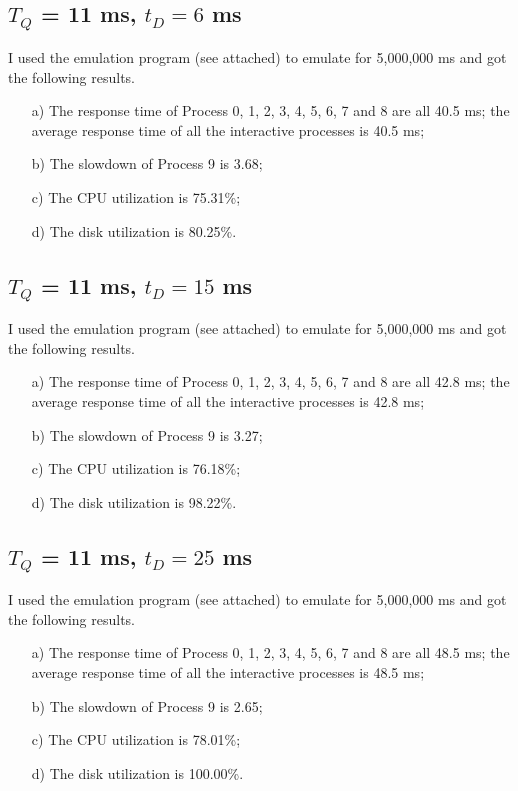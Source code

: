 \documentclass[12pt,letterpaper]{article}
\begin{document}
\subsection{$T_Q$ = 11 ms, $t_D=6$ ms}
I used the emulation program (see attached) to emulate for 5,000,000 ms and got the following results.
\begin{enumerate}
\item[a)] The response time of Process 0, 1, 2, 3, 4, 5, 6, 7 and 8 are all 40.5 ms; the average response time of all the interactive processes is 40.5 ms;
\item[b)] The slowdown of Process 9 is 3.68;
\item[c)] The CPU utilization is 75.31\%;
\item[d)] The disk utilization is 80.25\%.
\end{enumerate}

\subsection{$T_Q$ = 11 ms, $t_D=15$ ms}
I used the emulation program (see attached) to emulate for 5,000,000 ms and got the following results.
\begin{enumerate}
\item[a)] The response time of Process 0, 1, 2, 3, 4, 5, 6, 7 and 8 are all 42.8 ms; the average response time of all the interactive processes is 42.8 ms;
\item[b)] The slowdown of Process 9 is 3.27;
\item[c)] The CPU utilization is 76.18\%;
\item[d)] The disk utilization is 98.22\%.
\end{enumerate}

\subsection{$T_Q$ = 11 ms, $t_D=25$ ms}
I used the emulation program (see attached) to emulate for 5,000,000 ms and got the following results.
\begin{enumerate}
\item[a)] The response time of Process 0, 1, 2, 3, 4, 5, 6, 7 and 8 are all 48.5 ms; the average response time of all the interactive processes is 48.5 ms;
\item[b)] The slowdown of Process 9 is 2.65;
\item[c)] The CPU utilization is 78.01\%;
\item[d)] The disk utilization is 100.00\%.
\end{enumerate}
\end{document}
